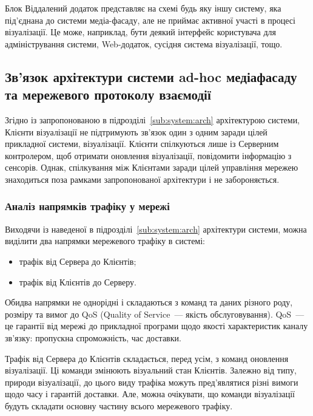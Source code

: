 \documentclass[a4paper,ukrainian,utf8,nocolumnsxix,floatsection,equationsection]{eskdtext}
\renewcommand\paragraph{\subsubsection}
\begin{document}
Блок Віддалений додаток представляє на схемі будь яку іншу систему, яка під'єднана до системи медіа-фасаду, але не приймає активної участі в процесі візуалізації. Це може, наприклад, бути деякий інтерфейс користувача для адміністрування системи, Web-додаток, сусідня система візуалізації, тощо.

\subsection{Зв'язок архітектури системи ad-hoc медіафасаду та мережевого протоколу взаємодії}

Згідно із запропонованою в підрозділі~\ref{sub:system:arch} архітектурою системи, Клієнти візуалізації не підтримують зв'язок один з одним заради цілей прикладної системи, візуалізації. Клієнти спілкуються лише із Серверним контролером, щоб отримати оновлення візуалізації, повідомити інформацію з сенсорів. Однак, спілкування між Клієнтами заради цілей управління мережею знаходиться поза рамками запропонованої архітектури і не забороняється.

\paragraph{Аналіз напрямків трафіку у мережі}
\label{par:traffic:cases}

Виходячи із наведеної в підрозділі~\ref{sub:system:arch} архітектури системи, можна виділити два напрямки мережевого трафіку в системі:
\begin{itemize}
	\item трафік від Сервера до Клієнтів;
	\item трафік від Клієнтів до Серверу.
\end{itemize}

Обидва напрямки не однорідні і складаються з команд та даних різного роду, розміру та вимог до QoS (Quality of Service~--- якість обслуговування). QoS~--- це гарантії від мережі до прикладної програми щодо якості характеристик каналу зв'язку: пропускна спроможність, час доставки.

Трафік від Сервера до Клієнтів складається, перед усім, з команд оновлення візуалізації. Ці команди змінюють візуальний стан Клієнтів. Залежно від типу, природи візуалізації, до цього виду трафіка можуть пред'являтися різні вимоги щодо часу і гарантій доставки. Але, можна очікувати, що команди візуалізації будуть складати основну частину всього мережевого трафіку.
\end{document}
